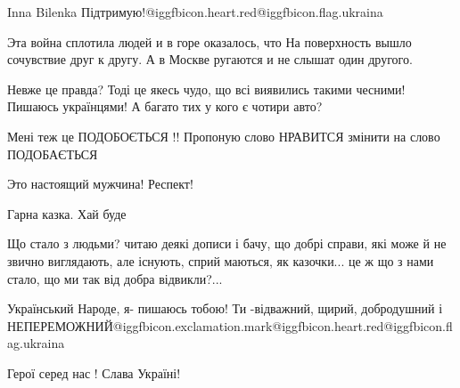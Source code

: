 \begin{itemize}
Inna Bilenka Підтримую!@igg{fbicon.heart.red}@igg{fbicon.flag.ukraina}

Эта война сплотила людей и в горе оказалось, что
На поверхность вышло сочувствие друг к другу.
А в Москве ругаются и не слышат один другого.

Невже це правда?
Тоді це якесь чудо, що всі виявились такими чесними! Пишаюсь українцями! А багато тих у кого є чотири авто?

Мені теж це ПОДОБОЄТЬСЯ !! Пропоную слово НРАВИТСЯ змінити на слово ПОДОБАЄТЬСЯ

Это настоящий мужчина!
Респект!

Гарна казка. Хай буде


Що стало з людьми? читаю деякі дописи і бачу, що добрі справи, які може й не
звично виглядають, але існують, сприй маються, як казочки... це ж що з нами
стало, що ми так від добра відвикли?...


Український Народе, я- пишаюсь тобою! Ти -відважний, щирий, добродушний і НЕПЕРЕМОЖНИЙ@igg{fbicon.exclamation.mark}@igg{fbicon.heart.red}@igg{fbicon.flag.ukraina}

Герої серед нас ! Слава Україні!


\end{itemize} %
